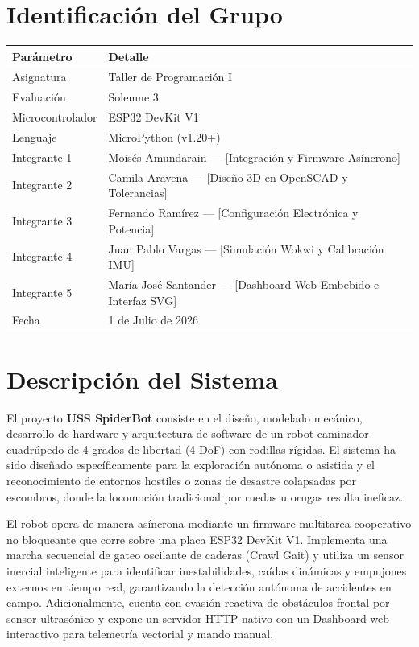 \documentclass[12pt]{article}
\begin{document}
\section{Identificación del Grupo}
\begin{table}[h!]
\centering
\begin{tabular}{p{5cm}p{10cm}}
\toprule
\textbf{Parámetro} & \textbf{Detalle} \\
\midrule
Asignatura & Taller de Programación I \\
Evaluación & Solemne 3 \\
Microcontrolador & ESP32 DevKit V1 \\
Lenguaje & MicroPython (v1.20+) \\
Integrante 1 & Moisés Amundarain — [Integración y Firmware Asíncrono] \\
Integrante 2 & Camila Aravena — [Diseño 3D en OpenSCAD y Tolerancias] \\
Integrante 3 & Fernando Ramírez — [Configuración Electrónica y Potencia] \\
Integrante 4 & Juan Pablo Vargas — [Simulación Wokwi y Calibración IMU] \\
Integrante 5 & María José Santander — [Dashboard Web Embebido e Interfaz SVG] \\
Fecha & 1 de Julio de 2026 \\
\bottomrule
\end{tabular}
\end{table}

\section{Descripción del Sistema}
El proyecto \textbf{USS SpiderBot} consiste en el diseño, modelado mecánico, desarrollo de hardware y arquitectura de software de un robot caminador cuadrúpedo de 4 grados de libertad (4-DoF) con rodillas rígidas. El sistema ha sido diseñado específicamente para la exploración autónoma o asistida y el reconocimiento de entornos hostiles o zonas de desastre colapsadas por escombros, donde la locomoción tradicional por ruedas u orugas resulta ineficaz.

El robot opera de manera asíncrona mediante un firmware multitarea cooperativo no bloqueante que corre sobre una placa ESP32 DevKit V1. Implementa una marcha secuencial de gateo oscilante de caderas (Crawl Gait) y utiliza un sensor inercial inteligente para identificar inestabilidades, caídas dinámicas y empujones externos en tiempo real, garantizando la detección autónoma de accidentes en campo. Adicionalmente, cuenta con evasión reactiva de obstáculos frontal por sensor ultrasónico y expone un servidor HTTP nativo con un Dashboard web interactivo para telemetría vectorial y mando manual.
\end{document}
